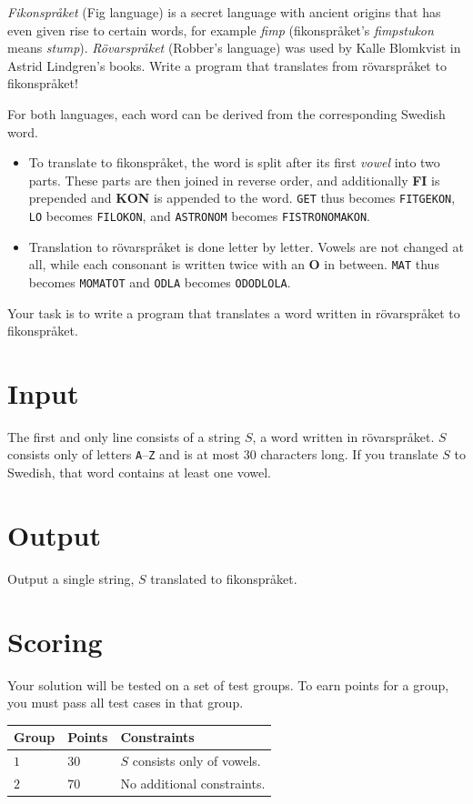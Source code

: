\textit{Fikonspråket} (Fig language) is a secret language with ancient origins that has even given rise to certain words,
for example \textit{fimp} (fikonspråket's \textit{fimpstukon} means \textit{stump}).
\textit{Rövarspråket} (Robber's language) was used by Kalle Blomkvist in Astrid Lindgren's books.
Write a program that translates from rövarspråket to fikonspråket!

For both languages, each word can be derived from the corresponding Swedish word.

\begin{itemize}
        \item To translate to fikonspråket, the word is split after its first \textit{vowel} into two parts. These parts are then joined in reverse order, and additionally \textbf{FI} is prepended and \textbf{KON} is appended to the word.
                \texttt{GET} thus becomes \texttt{FITGEKON},
                \texttt{LO} becomes \texttt{FILOKON}, and \texttt{ASTRONOM} becomes \texttt{FISTRONOMAKON}.
        \item Translation to rövarspråket is done letter by letter.
                Vowels are not changed at all, while each consonant is written twice with an \textbf{O} in between.
                \texttt{MAT} thus becomes \texttt{MOMATOT} and \texttt{ODLA} becomes \texttt{ODODLOLA}.
\end{itemize}


Your task is to write a program that translates a word written in rövarspråket to fikonspråket.

\section*{Input}
The first and only line consists of a string $S$, a word written in rövarspråket.
$S$ consists only of letters \texttt{A}--\texttt{Z} and is at most 30 characters long.
If you translate $S$ to Swedish, that word contains at least one vowel.

\section*{Output}
Output a single string, $S$ translated to fikonspråket.

\section*{Scoring}
Your solution will be tested on a set of test groups. To earn points for a group, you must pass all test cases in that group.


\noindent
\begin{tabular}{| l | l | p{12cm} |}
  \hline
  Group & Points & Constraints \\ \hline
  $1$   & $30$       & $S$ consists only of vowels. \\ \hline
  $2$   & $70$       & No additional constraints. \\ \hline
\end{tabular}
